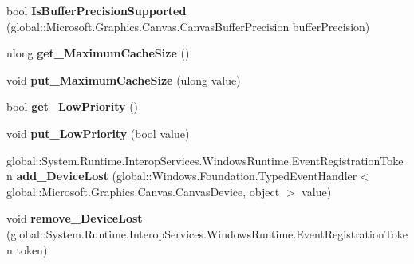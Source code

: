 \begin{DoxyCompactItemize}
\item 
\mbox{\label{class_microsoft_1_1_graphics_1_1_canvas_1_1_canvas_device_a05ed962d04bfea58842bb028fe6b8c4e}} 
bool {\bfseries Is\+Buffer\+Precision\+Supported} (global\+::\+Microsoft.\+Graphics.\+Canvas.\+Canvas\+Buffer\+Precision buffer\+Precision)
\item 
\mbox{\label{class_microsoft_1_1_graphics_1_1_canvas_1_1_canvas_device_a5f095678b43b4ace5f118aa2556deffe}} 
ulong {\bfseries get\+\_\+\+Maximum\+Cache\+Size} ()
\item 
\mbox{\label{class_microsoft_1_1_graphics_1_1_canvas_1_1_canvas_device_a87716d3ac1ed253fcee0a5e307d24b50}} 
void {\bfseries put\+\_\+\+Maximum\+Cache\+Size} (ulong value)
\item 
\mbox{\label{class_microsoft_1_1_graphics_1_1_canvas_1_1_canvas_device_a95f4876747bf8ac6c5fd2b67a83fed4f}} 
bool {\bfseries get\+\_\+\+Low\+Priority} ()
\item 
\mbox{\label{class_microsoft_1_1_graphics_1_1_canvas_1_1_canvas_device_ad1a2be7ca3c55a404a27d0e562278094}} 
void {\bfseries put\+\_\+\+Low\+Priority} (bool value)
\item 
\mbox{\label{class_microsoft_1_1_graphics_1_1_canvas_1_1_canvas_device_a631e1f27d9faf64d8b1ee234ffde2ed8}} 
global\+::\+System.\+Runtime.\+Interop\+Services.\+Windows\+Runtime.\+Event\+Registration\+Token {\bfseries add\+\_\+\+Device\+Lost} (global\+::\+Windows.\+Foundation.\+Typed\+Event\+Handler$<$ global\+::\+Microsoft.\+Graphics.\+Canvas.\+Canvas\+Device, object $>$ value)
\item 
\mbox{\label{class_microsoft_1_1_graphics_1_1_canvas_1_1_canvas_device_a4a4a0a58940cbe69bb830cd13b27e86c}} 
void {\bfseries remove\+\_\+\+Device\+Lost} (global\+::\+System.\+Runtime.\+Interop\+Services.\+Windows\+Runtime.\+Event\+Registration\+Token token)
\item 

\end{DoxyCompactItemize}
